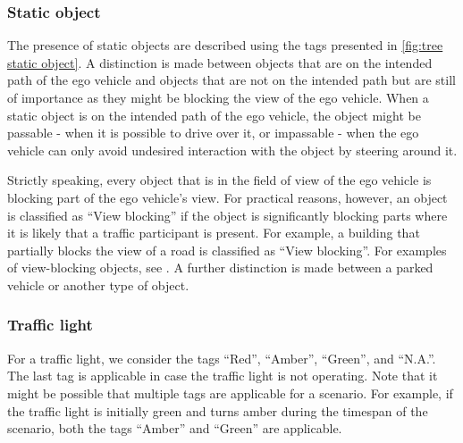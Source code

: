 \subsubsection{Static object}
\label{sec:static object}

The presence of static objects are described using the tags presented in \cref{fig:tree static object}. A distinction is made between objects that are on the intended path of the ego vehicle and objects that are not on the intended path but are still of importance as they might be blocking the view of the ego vehicle. When a static object is on the intended path of the ego vehicle, the object might be passable - when it is possible to drive over it, or impassable - when the ego vehicle can only avoid undesired interaction with the object by steering around it.

Strictly speaking, every object that is in the field of view of the ego vehicle is blocking part of the ego vehicle's view. For practical reasons, however, an object is classified as ``View blocking'' if the object is significantly blocking parts where it is likely that a traffic participant is present. For example, a building that partially blocks the view of a road is classified as ``View blocking''. For examples of view-blocking objects, see \cite{CATS2015}. A further distinction is made between a parked vehicle or another type of object.

%

\subsubsection{Traffic light}
\label{sec:traffic light}

For a traffic light, we consider the tags ``Red'', ``Amber'', ``Green'', and ``N.A.''. The last tag is applicable in case the traffic light is not operating.
Note that it might be possible that multiple tags are applicable for a scenario. For example, if the traffic light is initially green and turns amber during the timespan of the scenario, both the tags ``Amber'' and ``Green'' are applicable.

